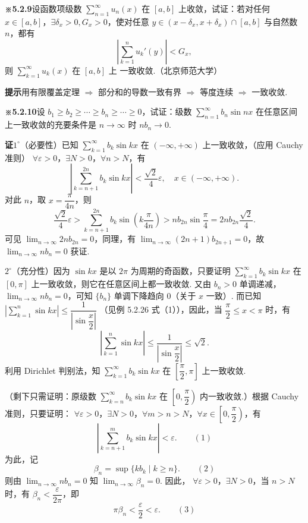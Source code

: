 \documentclass[UTF8,12pt,a4paper,fontset=fandol]{ctexart}
\begin{document}
\noindent\textbf{※5.2.9}\quad 设函数项级数 $\displaystyle\sum_{n=1}^{\infty}u_n(x)$ 在 $[a,b]$ 上收敛，试证：若对任何
$x\in[a,b]$，$\exists\delta_x>0,G_x>0$，使对任意 $y\in(x-\delta_x,x+\delta_x)\cap[a,b]$ 与自然数 $n$，都有
\[
  \left|\sum_{k=1}^n u_k'(y)\right|<G_x,
\]
则 $\displaystyle\sum_{k=1}^{\infty}u_k(x)$ 在 $[a,b]$ 上
一致收敛.（北京师范大学）

\noindent\textbf{提示}\quad 用有限覆盖定理 $\Rightarrow$ 部分和的导数一致有界 $\Rightarrow$ 等度连续 $\Rightarrow$ 一致收敛.

\noindent\textbf{※5.2.10}\quad 设 $b_1\ge b_2\ge\cdots\ge b_n\ge\cdots\ge0$，试证：级数
$\displaystyle\sum_{n=1}^{\infty}b_n\sin nx$ 在任意区间上一致收敛的充要条件是 $n\to\infty$ 时
$nb_n\to0$.

\noindent\textbf{证}\quad $1^\circ$（必要性）已知
$\displaystyle\sum_{k=1}^{\infty}b_k\sin kx$ 在 $(-\infty,+\infty)$ 上一致收敛，（应用 Cauchy 准则）
$\forall\varepsilon>0$，$\exists N>0$，$\forall n>N$，有
\[
  \left|\sum_{k=n+1}^{2n}b_k\sin kx\right|<\frac{\sqrt2}{4}\varepsilon,\quad
  x\in(-\infty,+\infty).
\]
对此 $n$，取 $x=\dfrac{\pi}{4n}$，则
\[
  \frac{\sqrt2}{4}\varepsilon
  >\sum_{k=n+1}^{2n}b_k\sin\left(k\frac{\pi}{4n}\right)
  >nb_{2n}\sin\frac\pi4=2nb_{2n}\frac{\sqrt2}{4}.
\]
可见 $\displaystyle\lim_{n\to\infty}2nb_{2n}=0$，同理，有
$\displaystyle\lim_{n\to\infty}(2n+1)b_{2n+1}=0$，故
$\displaystyle\lim_{n\to\infty}nb_n=0$ 获证.

$2^\circ$（充分性）因为 $\sin kx$ 是以 $2\pi$ 为周期的奇函数，只要证明
$\displaystyle\sum_{k=1}^{\infty}b_k\sin kx$ 在 $[0,\pi]$ 上一致收敛，则它在任意区间上都一致收敛. 又由
$b_n>0$ 单调递减，$\displaystyle\lim_{n\to\infty}nb_n=0$，可知 $\{b_n\}$ 单调下降趋向 0（关于
$x$ 一致）. 而已知
$\left|\displaystyle\sum_{k=1}^n\sin kx\right|\le\dfrac1{\left|\sin\dfrac x2\right|}$
（见例 5.2.26 式（1）），因此，当 $\dfrac\pi2\le x<\pi$ 时，有
\[
  \left|\sum_{k=1}^n\sin kx\right|
  \le\frac1{\left|\sin\dfrac x2\right|}\le\sqrt2.
\]
利用 Dirichlet 判别法，知
$\displaystyle\sum_{k=1}^{\infty}b_k\sin kx$ 在 $\left[\dfrac\pi2,\pi\right]$ 上一致收敛.

（剩下只需证明：原级数 $\displaystyle\sum_{k=n}^{\infty}b_k\sin kx$ 在
$\left[0,\dfrac\pi2\right)$ 内一致收敛.）根据 Cauchy 准则，只要证明：
$\forall\varepsilon>0$，$\exists N>0$，$\forall m>n>N$，$\forall x\in\left[0,\dfrac\pi2\right)$，有
\[
  \left|\sum_{k=n+1}^{m}b_k\sin kx\right|<\varepsilon.
\qquad(1)
\]
为此，记
\[
  \beta_n=\sup\{kb_k\mid k\ge n\}.
\qquad(2)
\]
则由 $\displaystyle\lim_{n\to\infty}nb_n=0$ 知 $\displaystyle\lim_{n\to\infty}\beta_n=0$. 因此，
$\forall\varepsilon>0$，$\exists N>0$，当 $n>N$ 时，有
$\beta_n<\dfrac{\varepsilon}{2\pi}$，即
\[
  \pi\beta_n<\frac\varepsilon2<\varepsilon.
\qquad(3)
\]
\end{document}

